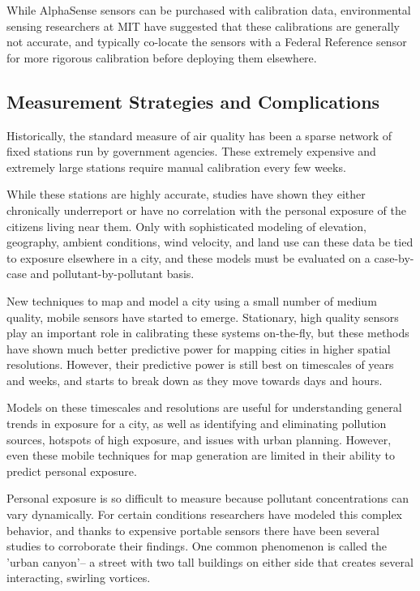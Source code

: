 While AlphaSense sensors can be purchased with calibration data, environmental sensing researchers at MIT have suggested that these calibrations are generally not accurate, and typically co-locate the sensors with a Federal Reference sensor for more rigorous calibration before deploying them elsewhere. 

\subsection{Measurement Strategies and Complications}

Historically, the standard measure of air quality has been a sparse network of fixed stations run by government agencies.  These extremely expensive and extremely large stations require manual calibration every few weeks.
	
While these stations are highly accurate, studies have shown they either chronically underreport or have no correlation with the personal exposure of the citizens living near them. Only with sophisticated modeling of elevation, geography, ambient conditions, wind velocity, and land use can these data be tied to exposure elsewhere in a city, and these models must be evaluated on a case-by-case and pollutant-by-pollutant basis.  
	
New techniques to map and model a city using a small number of medium quality, mobile sensors have started to emerge. Stationary, high quality sensors play an important role in calibrating these systems on-the-fly, but these methods have shown much better predictive power for mapping cities in higher spatial resolutions.  However, their predictive power is still best on timescales of years and weeks, and starts to break down as they move towards days and hours.

Models on these timescales and resolutions are useful for understanding general trends in exposure for a city, as well as identifying and eliminating pollution sources, hotspots of high exposure, and issues with urban planning.  However, even these mobile techniques for map generation are limited in their ability to predict personal exposure.

Personal exposure is so difficult to measure because pollutant concentrations can vary dynamically.  For certain conditions researchers have modeled this complex behavior, and thanks to expensive portable sensors there have been several studies to corroborate their findings.  One common phenomenon is called the 'urban canyon'-- a street with two tall buildings on either side that creates several interacting, swirling vortices.

